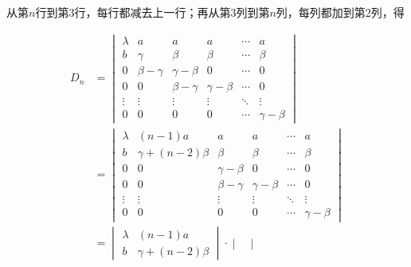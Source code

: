 \documentclass[UTF8,12pt,a4paper,fontset=fandol]{ctexart}
\begin{document}
\begin{solve}
从第$n$行到第3行，每行都减去上一行；再从第3列到第$n$列，每列都加到第2列，得

            \begin{align*}
                D_n & =
                \begin{vmatrix}
                    \lambda & a            & a            & a            & \cdots & a            \\
                    b       & \gamma       & \beta        & \beta        & \cdots & \beta        \\
                    0       & \beta-\gamma & \gamma-\beta & 0            & \cdots & 0            \\
                    0       & 0            & \beta-\gamma & \gamma-\beta & \cdots & 0            \\
                    \vdots  & \vdots       & \vdots       & \vdots       & \ddots & \vdots       \\
                    0       & 0            & 0            & 0            & \cdots & \gamma-\beta
                \end{vmatrix}             \\
                    & =\begin{vmatrix}
                           \lambda & (n-1)a            & a            & a            & \cdots & a            \\
                           b       & \gamma+(n-2)\beta & \beta        & \beta        & \cdots & \beta        \\
                           0       & 0                 & \gamma-\beta & 0            & \cdots & 0            \\
                           0       & 0                 & \beta-\gamma & \gamma-\beta & \cdots & 0            \\
                           \vdots  & \vdots            & \vdots       & \vdots       & \ddots & \vdots       \\
                           0       & 0                 & 0            & 0            & \cdots & \gamma-\beta
                       \end{vmatrix} \\
                    & =\begin{vmatrix}
                           \lambda & (n-1)a            \\
                           b       & \gamma+(n-2)\beta
                       \end{vmatrix} \cdot \begin{vmatrix}

\end{vmatrix}
\end{align*}
\end{solve}
\end{document}
